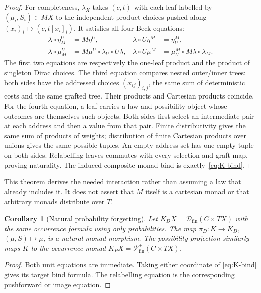 \documentclass[11pt,a4paper]{article}
\newtheorem{corollary}[theorem]{Corollary}
\theoremstyle{definition}
\newcommand{\Dfin}{\mathcal D_{\mathrm{fin}}}
\newcommand{\Pfin}{\mathcal P_{\mathrm{fin}}^{+}}
\begin{document}
\begin{proof}
For completeness, $\lambda_X$ takes $(c,t)$ with each leaf labelled by
$(\mu_i,S_i)\in MX$ to the independent product choices pushed along
$(x_i)_i\mapsto(c,t[x_i]_i)$. It satisfies all four Beck equations:
\begin{align*}
 \lambda\circ\eta^U_M&=M\eta^U,&
 \lambda\circ U\eta^M&=\eta^M_U,\\
 \lambda\circ\mu^U_M&=M\mu^U\circ\lambda_U\circ U\lambda,&
 \lambda\circ U\mu^M&=\mu^M_U\circ M\lambda\circ\lambda_M.
\end{align*}
The first two equations are respectively the one-leaf product and the
product of singleton Dirac choices. The third equation compares nested
outer/inner trees: both sides have the addressed choices $(x_{ij})_{i,j}$,
the same sum of deterministic costs and the same grafted tree. Their
products and Cartesian products coincide. For the fourth equation, a
leaf carries a law-and-possibility object whose outcomes are themselves
such objects. Both sides first select an intermediate pair at each
address and then a value from that pair. Finite distributivity gives the
same sum of products of weights; distribution of finite Cartesian
products over unions gives the same possible tuples. An empty address
set has one empty tuple on both sides. Relabelling leaves commutes with
every selection and graft map, proving naturality. The induced composite
monad bind is exactly~\eqref{eq:K-bind}.
\end{proof}
This theorem derives the needed interaction rather than assuming a
law that already includes it. It does not assert that $M$ itself is a
cartesian monad or that arbitrary monads distribute over $T$.

\begin{corollary}[Natural probability forgetting]\label{cor:forget}
Let $K_DX=\Dfin(C\times TX)$ with the same occurrence formula using
only probabilities. The map $\pi_D:K\to K_D$, $(\mu,S)\mapsto\mu$,
is a natural monad morphism. The possibility projection similarly maps
$K$ to the occurrence monad $K_PX=\Pfin(C\times TX)$.
\end{corollary}
\begin{proof}
Both unit equations are immediate. Taking either coordinate of
\eqref{eq:K-bind} gives its target bind formula. The relabelling equation
is the corresponding pushforward or image equation.
\end{proof}
\end{document}

